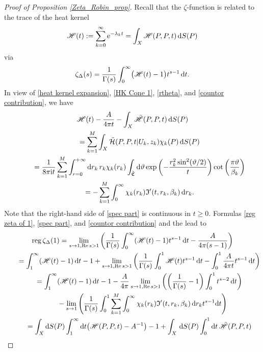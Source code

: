 \documentclass[pdftex]{sigma}
\numberwithin{equation}{section}
\theoremstyle{definition}
\begin{document}
\begin{proof}[Proof of Proposition \ref{Zeta_Robin_prop}] Recall that the $\zeta$-function is related to the trace of the heat kernel
\[\mathscr{H}(t):=\sum_{k=0}^{\infty}{\rm e}^{-\lambda_k t}=\int_X \mathscr{H}(P,P,t)\,{\rm d }S(P)\]
via
\[\zeta_\Delta(s)=\frac{1}{\Gamma(s)}\int_{0}^{\infty}\bigl(\mathscr{H}(t)-1\bigr)t^{s-1}\,{\rm d}t.\]
In view of \eqref{heat kernel expansion}, \eqref{HK Cone 1}, \eqref{rtheta}, and \eqref{countor contribution}, we have
\begin{gather}
\mathscr{H}(t)-\frac{A}{4\pi t}-\int_X\tilde{\mathscr{H}}(P,P,t)\,{\rm d }S(P)\nonumber\\
\qquad=\sum_{k=1}^M\int_X\tilde{\mathcal{H}}(P,P,t|U_k,z_k)\chi_k(P)\,{\rm d }S(P)\nonumber\\
\qquad=\frac{1}{8\pi {\rm i} t}\sum_{k=1}^M\int_{r=0}^{+\infty}{\rm d}r_k\, r_k\chi_k(r_k)\int_{\tilde{\mathfrak{C}}}{\rm d}\vartheta \exp\left(-\frac{r_k^2\sin^2(\vartheta/2)}{t}\right)\operatorname{cot}\left(\frac{\pi\vartheta}{\beta_k}\right)\nonumber\\
\qquad=-\sum_{k=1}^M\int_{0}^{\infty}\chi_k(r_k)\mathfrak{I}'(t,r_k,\beta_k)\,{\rm d}r_k.\label{spec part}
\end{gather}
Note that the right-hand side of \eqref{spec part} is continuous in $t\ge 0$. Formulas \eqref{reg zeta of 1}, \eqref{spec part}, and \eqref{countor contribution} and the lead to
\begin{gather*}
\operatorname{reg}\zeta_\Delta(1)=\lim_{s\to 1, \operatorname{Re} s>1}\left(\frac{1}{\Gamma(s)}\int_0^\infty (\mathscr{H}(t)-1 )t^{s-1}\, {\rm d}t-\frac{A}{4\pi(s-1)}\right)
\\
\qquad=\int_1^\infty (\mathscr{H}(t)-1 )\,{\rm d}t-1+\lim_{s\to 1, \operatorname{Re} s>1}\left(\frac{1}{\Gamma(s)}\int_0^1\mathscr{H}(t)t^{s-1}\, {\rm d}t-\int_0^1\frac{A}{4\pi t}t^{s-1}\,{\rm d}t\right)
\\
\qquad=\int_1^\infty (\mathscr{H}(t)-1 )\,{\rm d}t-1-\frac{A}{4\pi}\lim_{s\to 1, \operatorname{Re} s>1}\left(\left(\frac{1}{\Gamma(s)}-1\right)\int_0^1t^{s-2}\, {\rm d}t\right)
\\
\phantom{\qquad=}{}-\lim_{s\to 1}\left(\frac{1}{\Gamma(s)}\int_0^1\sum_{k=1}^M\int_{0}^{\infty}\chi_k(r_k)\mathfrak{I}'(t,r_k,\beta_k)\,{\rm d}r_k t^{s-1}{\rm d}t\right)
\\
\qquad=\int_{X}{\rm d }S(P)\int_1^\infty {\rm d}t\big(\mathscr{H}(P,P,t)-A^{-1}\big)-1+\int_X\, {\rm d }S(P)\int_0^1 {\rm d}t \, \tilde{\mathscr{H}}(P,P,t)
\\

\end{gather*}
\end{proof}
\end{document}

